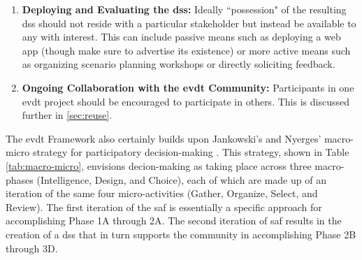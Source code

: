 \begin{enumerate}
	\item{\textbf{Deploying and Evaluating the \ac{dss}:} Ideally ``possession" of the resulting \ac{dss} should not reside with a particular stakeholder but instead be available to any with interest. This can include passive means such as deploying a web app (though make sure to advertise its existence) or more active means such as organizing scenario planning workshops or directly soliciting feedback.}
	\item{\textbf{Ongoing Collaboration with the \ac{evdt} Community:} Participants in one \ac{evdt} project should be encouraged to participate in others. This is discussed further in \ref{sec:reuse}.}
\end{enumerate}

The \ac{evdt} Framework also certainly builds upon Jankowski's and Nyerges' macro-micro strategy for participatory decision-making \cite{jankowskiGISGroupDecision2001}. This strategy, shown in Table \ref{tab:macro-micro}, envisions decion-making as taking place across three macro-phases (Intelligence, Design, and Choice), each of which are made up of an iteration of the same four micro-activities (Gather, Organize, Select, and Review). The first iteration of the \ac{saf} is essentially a specific approach for accomplishing Phase 1A through 2A. The second iteration of \ac{saf} results in the creation of a \ac{dss} that in turn supports the community in accomplishing Phase 2B through 3D. 

